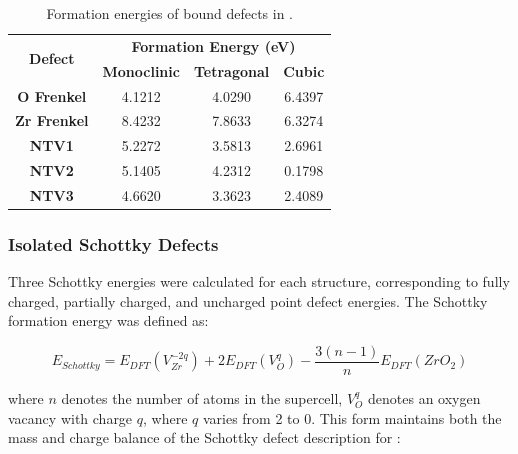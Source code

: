 \begin{table}[ht] %
\onehalfspacing
\centering
\caption{Formation energies of bound defects in \zirconia.}
\label{table:bound_defects}
\begin{tabular}{cccc}
\hline
\multirow{2}{*}{\textbf{Defect}} & \multicolumn{3}{c}{\textbf{Formation Energy (eV)}} \\ \cline{2-4} 
 & \textbf{Monoclinic} & \textbf{Tetragonal} & \textbf{Cubic} \\ \hline
\textbf{O Frenkel} & 4.1212 & 4.0290 & 6.4397 \\
\textbf{Zr Frenkel} & 8.4232 & 7.8633 & 6.3274 \\
\textbf{NTV1} & 5.2272 & 3.5813 & 2.6961 \\
\textbf{NTV2} & 5.1405 & 4.2312 & 0.1798 \\
\textbf{NTV3} & 4.6620 & 3.3623 & 2.4089 \\ \hline
\end{tabular}
\end{table}


\subsubsection*{Isolated Schottky Defects}

Three Schottky energies were calculated for each structure, corresponding to fully charged, partially charged, and uncharged point defect energies. The Schottky formation energy was defined as:

\begin{equation}
\label{equation_schottky}
E_{Schottky} = E_{DFT}(V^{-2q}_{Zr}) + 2E_{DFT}(V^{q}_{O}) -\frac{3(n-1)}{n}E_{DFT}(ZrO_2)%
\end{equation}

where $n$ denotes the number of atoms in the supercell, $V^{q}_{O}$ denotes an oxygen vacancy with charge $q$, where $q$ varies from 2 to 0. This form maintains both the mass and charge balance of the Schottky defect description for \zirconia :

